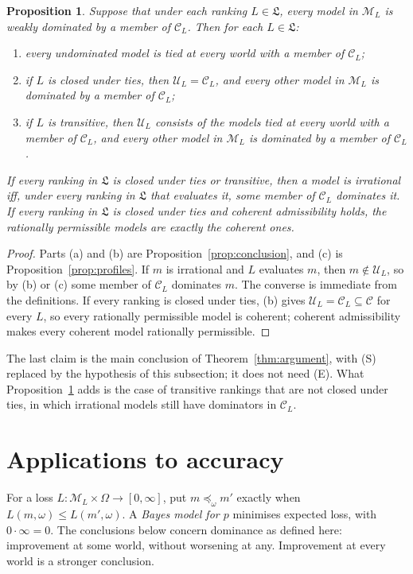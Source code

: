 \documentclass[11pt]{article}
\newtheorem{proposition}[theorem]{Proposition}
\theoremstyle{definition}
\newcommand{\M}{\mathcal M}
\newcommand{\C}{\mathcal C}
\newcommand{\U}{\mathcal U}
\newcommand{\Lf}{\mathfrak L}
\begin{document}
\begin{proposition}\label{prop:permissible}
Suppose that under each ranking $L\in\Lf$, every model in $\M_L$ is weakly dominated by a member of $\C_L$. Then for each $L\in\Lf$:
\begin{enumerate}[label=(\alph*)]
\item every undominated model is tied at every world with a member of $\C_L$;
\item if $L$ is closed under ties, then $\U_L=\C_L$, and every other model in $\M_L$ is dominated by a member of $\C_L$;
\item if $L$ is transitive, then $\U_L$ consists of the models tied at every world with a member of $\C_L$, and every other model in $\M_L$ is dominated by a member of $\C_L$.
\end{enumerate}
If every ranking in $\Lf$ is closed under ties or transitive, then a model is irrational iff, under every ranking in $\Lf$ that evaluates it, some member of $\C_L$ dominates it. If every ranking in $\Lf$ is closed under ties and coherent admissibility holds, the rationally permissible models are exactly the coherent ones.
\end{proposition}
\begin{proof}
Parts (a) and (b) are Proposition~\ref{prop:conclusion}, and (c) is Proposition~\ref{prop:profiles}. If $m$ is irrational and $L$ evaluates $m$, then $m\notin\U_L$, so by (b) or (c) some member of $\C_L$ dominates $m$. The converse is immediate from the definitions. If every ranking is closed under ties, (b) gives $\U_L=\C_L\subseteq\C$ for every $L$, so every rationally permissible model is coherent; coherent admissibility makes every coherent model rationally permissible.
\end{proof}
The last claim is the main conclusion of Theorem~\ref{thm:argument}, with (S) replaced by the hypothesis of this subsection; it does not need (E). What Proposition~\ref{prop:permissible} adds is the case of transitive rankings that are not closed under ties, in which irrational models still have dominators in $\C_L$.

\section{Applications to accuracy}\label{sec:short-applications}
For a loss $L:\M_L\times\Omega\to[0,\infty]$, put $m\preceq_\omega m'$ exactly when $L(m,\omega)\le L(m',\omega)$. A \emph{Bayes model for $p$} minimises expected loss, with $0\cdot\infty=0$. The conclusions below concern dominance as defined here: improvement at some world, without worsening at any. Improvement at every world is a stronger conclusion.
\end{document}

